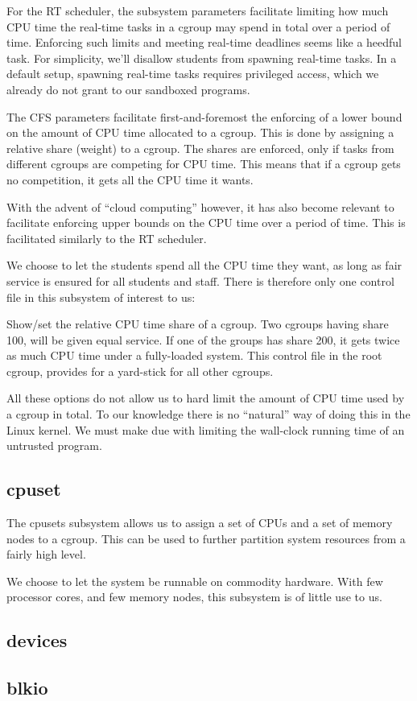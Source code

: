 For the RT scheduler, the subsystem parameters facilitate limiting how much CPU
time the real-time tasks in a cgroup may spend in total over a period of time.
Enforcing such limits and meeting real-time deadlines seems like a heedful
task. For simplicity, we'll disallow students from spawning real-time tasks. In
a default setup, spawning real-time tasks requires privileged access, which we
already do not grant to our sandboxed programs.

The CFS parameters facilitate first-and-foremost the enforcing of a lower bound
on the amount of CPU time allocated to a cgroup. This is done by assigning a
relative share (weight) to a cgroup. The shares are enforced, only if tasks
from different cgroups are competing for CPU time. This means that if a cgroup
gets no competition, it gets all the CPU time it wants.

With the advent of ``cloud computing'' however, it has also become relevant to
facilitate enforcing upper bounds on the CPU time over a period of
time\cite{turner-et-al-2010}. This is facilitated similarly to the RT scheduler.

We choose to let the students spend all the CPU time they want, as long as fair
service is ensured for all students and staff. There is therefore only one
control file in this subsystem of interest to us:

\begin{description}[\setleftmargin{0.2in}\breaklabel\setlabelstyle{\tt}]

\item[cpu.shares] Show/set the relative CPU time share of a cgroup. Two cgroups
having share 100, will be given equal service. If one of the groups has share
200, it gets twice as much CPU time under a fully-loaded system. This control
file in the root cgroup, provides for a yard-stick for all other cgroups.

\end{description}

All these options do not allow us to hard limit the amount of CPU time used by
a cgroup in total. To our knowledge there is no ``natural'' way of doing this
in the Linux kernel. We must make due with limiting the wall-clock running time
of an untrusted program.

\subsection{cpuset}

The cpusets subsystem allows us to assign a set of CPUs and a set of memory
nodes to a cgroup. This can be used to further partition system resources from
a fairly high level.

We choose to let the system be runnable on commodity hardware. With few
processor cores, and few memory nodes, this subsystem is of little use to us.

\subsection{devices}

\subsection{blkio}
